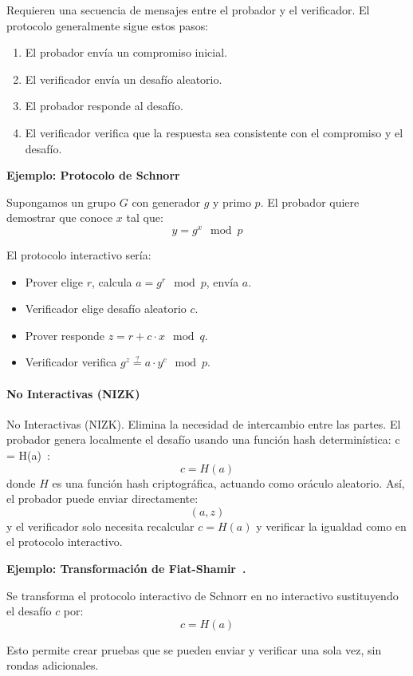 \documentclass{article}
\begin{document}
Requieren una secuencia de mensajes entre el probador y el verificador. El protocolo generalmente sigue estos pasos:
\begin{enumerate}
    \item El probador envía un compromiso inicial.
    \item El verificador envía un desafío aleatorio.
    \item El probador responde al desafío.
    \item El verificador verifica que la respuesta sea consistente con el compromiso y el desafío.
\end{enumerate}

\textbf{Ejemplo: Protocolo de Schnorr}

Supongamos un grupo \( G \) con generador \( g \) y primo \( p \). El probador quiere demostrar que conoce \( x \) tal que:
\[
y = g^x \mod p
\]

El protocolo interactivo sería:
\begin{itemize}
    \item Prover elige \( r \), calcula \( a = g^r \mod p \), envía \( a \).
    \item Verificador elige desafío aleatorio \( c \).
    \item Prover responde \( z = r + c \cdot x \mod q \).
    \item Verificador verifica \( g^z \stackrel{?}{=} a \cdot y^c \mod p \).
\end{itemize}

\paragraph{No Interactivas (NIZK)}

No Interactivas (NIZK). Elimina la necesidad de intercambio entre las partes. El probador genera localmente el desafío usando una función hash determinística: c = H(a)~\cite{fiat1986}:
\[
c = H(a)
\]
donde \( H \) es una función hash criptográfica, actuando como oráculo aleatorio. Así, el probador puede enviar directamente:
\[
(a, z)
\]
y el verificador solo necesita recalcular \( c = H(a) \) y verificar la igualdad como en el protocolo interactivo.

\textbf{Ejemplo: Transformación de Fiat-Shamir~\cite{fiat1986}.}

Se transforma el protocolo interactivo de Schnorr en no interactivo sustituyendo el desafío \( c \) por:
\[
c = H(a)
\]

Esto permite crear pruebas que se pueden enviar y verificar una sola vez, sin rondas adicionales.
\end{document}
